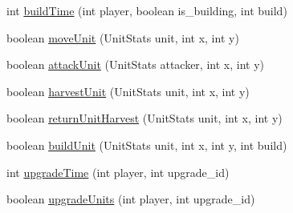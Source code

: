 \begin{DoxyCompactItemize}
\item 
int \hyperlink{classrts_1_1_physical_game_state_a434fd410463af81910417b303ab3fb0d}{buildTime} (int player, boolean is\_\-building, int build)
\item 
boolean \hyperlink{classrts_1_1_physical_game_state_afdbbb9a75e7e0fe59f626917e7e5b51d}{moveUnit} (UnitStats unit, int x, int y)
\item 
boolean \hyperlink{classrts_1_1_physical_game_state_a4c0de096264e4549dd73b7ebcecc425d}{attackUnit} (UnitStats attacker, int x, int y)
\item 
boolean \hyperlink{classrts_1_1_physical_game_state_a468dcd9ce7f55ab1ba02db780ac80c71}{harvestUnit} (UnitStats unit, int x, int y)
\item 
boolean \hyperlink{classrts_1_1_physical_game_state_a6f999ed335f528902c5039af5e4c312c}{returnUnitHarvest} (UnitStats unit, int x, int y)
\item 
boolean \hyperlink{classrts_1_1_physical_game_state_abb8e5e32d1cda902e608a66d10d2442c}{buildUnit} (UnitStats unit, int x, int y, int build)
\item 
int \hyperlink{classrts_1_1_physical_game_state_a56b9b99fef5887c6423d8590cd1a5672}{upgradeTime} (int player, int upgrade\_\-id)
\item 
boolean \hyperlink{classrts_1_1_physical_game_state_abb2c6684ab364687bbdc76abad1c2fe6}{upgradeUnits} (int player, int upgrade\_\-id)
\end{DoxyCompactItemize}
